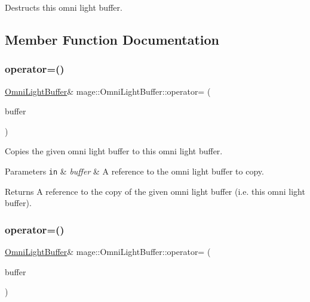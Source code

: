 Destructs this omni light buffer. 

\subsection{Member Function Documentation}
\hypertarget{structmage_1_1_omni_light_buffer_afc27989dfccb6bc8b58be462d35b989e}{}\label{structmage_1_1_omni_light_buffer_afc27989dfccb6bc8b58be462d35b989e} 
\subsubsection{\texorpdfstring{operator=()}{operator=()}\hspace{0.1cm}{\footnotesize\ttfamily [1/2]}}
{\footnotesize\ttfamily \hyperlink{structmage_1_1_omni_light_buffer}{Omni\+Light\+Buffer}\& mage\+::\+Omni\+Light\+Buffer\+::operator= (\begin{DoxyParamCaption}\item[{const \hyperlink{structmage_1_1_omni_light_buffer}{Omni\+Light\+Buffer} \&}]{buffer }\end{DoxyParamCaption})\hspace{0.3cm}{\ttfamily [default]}}

Copies the given omni light buffer to this omni light buffer.


\begin{DoxyParams}[1]{Parameters}
\mbox{\tt in}  & {\em buffer} & A reference to the omni light buffer to copy. \\
\hline
\end{DoxyParams}
\begin{DoxyReturn}{Returns}
A reference to the copy of the given omni light buffer (i.\+e. this omni light buffer). 
\end{DoxyReturn}
\hypertarget{structmage_1_1_omni_light_buffer_ae089377a7ddd063042848a360f2e0f49}{}\label{structmage_1_1_omni_light_buffer_ae089377a7ddd063042848a360f2e0f49} 
\subsubsection{\texorpdfstring{operator=()}{operator=()}\hspace{0.1cm}{\footnotesize\ttfamily [2/2]}}
{\footnotesize\ttfamily \hyperlink{structmage_1_1_omni_light_buffer}{Omni\+Light\+Buffer}\& mage\+::\+Omni\+Light\+Buffer\+::operator= (\begin{DoxyParamCaption}\item[{\hyperlink{structmage_1_1_omni_light_buffer}{Omni\+Light\+Buffer} \&\&}]{buffer }\end{DoxyParamCaption})\hspace{0.3cm}{\ttfamily [default]}}

